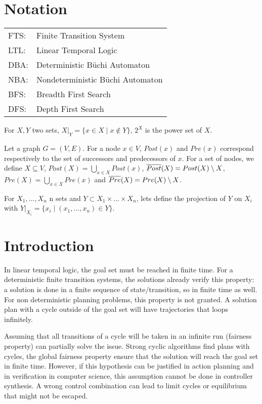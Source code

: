 \section*{Notation}
\begin{tabular}{ll}
FTS:& Finite Transition System\\
LTL:& Linear Temporal Logic\\
DBA:& Deterministic B\"uchi Automaton\\
NBA:& Nondeterministic B\"uchi Automaton\\
BFS:& Breadth First Search\\
DFS:& Depth First Search\\
\end{tabular}

For $X,Y$ two sets, $X|_Y = \{x \in X \mid x \notin  Y \}$, $2^X$ is the power set of $X$.

Let a graph $G = (V,E)$.
For a node $x \in V$, $Post(x)$ and $Pre(x)$ correspond respectively to the set of successors and predecessors of $x$. 
For a set of nodes, we define $X \subseteq V$, $Post(X) = \bigcup_{x \in X} Post(x)$, $\overline{Post} (X) = Post(X) \setminus X$, $Pre(X) = \bigcup_{x \in X} Pre(x)$ and $\overline{Pre} (X) = Pre(X) \setminus X$.

For $X_1,\dots,X_n$ n sets and $Y \subset X_1 \times \dots \times X_n$, lets define the projection of $Y$ on $X_i$ with $Y|_{X_i} = \{x_i \mid (x_1,\dots,x_n) \in Y\}$.

\section{Introduction}

In linear temporal logic, the goal set must be reached in finite time. For a deterministic finite transition systems, the solutions already verify this property: a solution is done in a finite sequence of state/transition, so in finite time as well.
For non deterministic planning problems, this property is not granted. A solution plan with a cycle outside of the goal set will have trajectories that loops infinitely.

Assuming that all transitions of a cycle will be taken in an infinite run (fairness property) can partially solve the issue.
Strong cyclic algorithms find plans with cycles, the global fairness property ensure that the solution will reach the goal set in finite time.
However, if this hypothesis can be justified in action planning and in verification in computer science, this assumption cannot be done in controller synthesis.
A wrong control combination can lead to limit cycles or equilibrium that might not be escaped.

